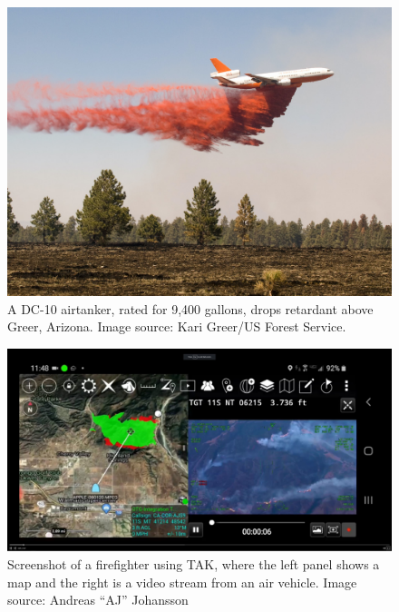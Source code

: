 \documentclass[]             %
{NASA}                       %
\theoremstyle{definition}
\begin{document}
\begin{figure}
  \centering
  \includegraphics[scale=0.4]{images/dc10.jpg}
  \caption{A DC-10 airtanker, rated for 9,400 gallons, drops retardant
    above Greer, Arizona. Image source: Kari Greer/US Forest Service.}\label{fig:airtanker}
\end{figure}

\begin{figure}
  \centering
  \includegraphics[scale=0.15]{images/forestfire-videox-scaled.jpg}
  \caption{Screenshot of a firefighter using TAK, where the left
    panel shows a map and the right is a video stream from an air
    vehicle. Image source: Andreas ``AJ'' Johansson}\label{fig:atak}
\end{figure}
\end{document}
